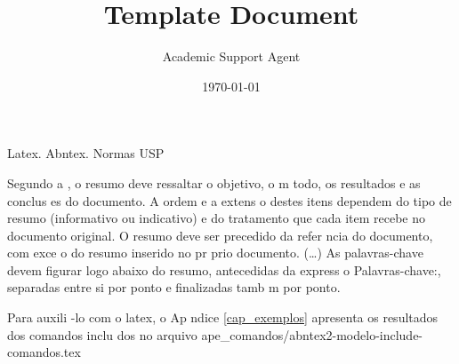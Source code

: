 \documentclass{article}
\title{Template Document}
\author{Academic Support Agent}
\date{\today}
\begin{document}
\maketitle

\renewcommand{\orientadorname}{Orientador:}
\renewcommand{\coorientadorname}{Coorientador:}
\renewcommand{\agradecimentosname}{Agradecimentos}

\pretextual

\maketitle






\begin{resumo}{Latex. Abntex. Normas USP}

 	 Segundo a , o resumo deve ressaltar o  objetivo, o m todo, os resultados e as conclus es do documento. A ordem e a extens o  destes itens dependem do tipo de resumo (informativo ou indicativo) e do  tratamento que cada item recebe no documento original. O resumo deve ser  precedido da refer ncia do documento, com exce o do resumo inserido no  pr prio documento. (\ldots) As palavras-chave devem figurar logo abaixo do  resumo, antecedidas da express o Palavras-chave:, separadas entre si por  ponto e finalizadas tamb m por ponto.
     
    Para auxili -lo com o latex, o Ap ndice 
  \ref{cap_exemplos} apresenta os resultados dos comandos inclu dos no arquivo ape\_comandos/abntex2-modelo-include-comandos.tex 

\end{resumo}
\end{document}
